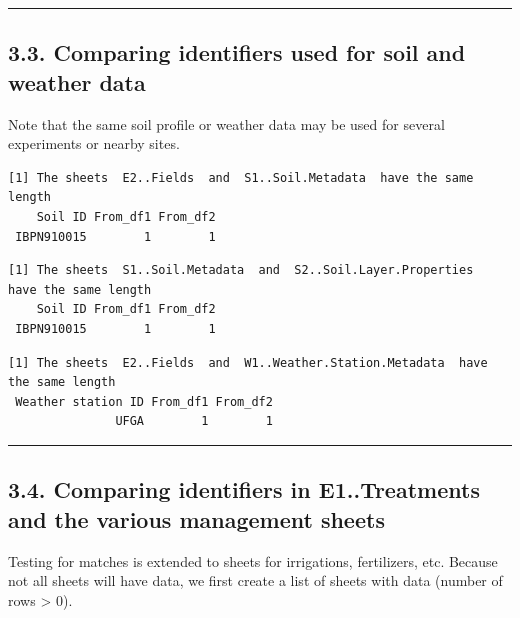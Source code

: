 \documentclass[
]{article}
\begin{document}
\begin{center}\rule{0.5\linewidth}{0.5pt}\end{center}

\subsection{3.3. Comparing identifiers used for soil and weather
data}\label{comparing-identifiers-used-for-soil-and-weather-data}

Note that the same soil profile or weather data may be used for several
experiments or nearby sites.

\begin{verbatim}
[1] The sheets  E2..Fields  and  S1..Soil.Metadata  have the same length
    Soil ID From_df1 From_df2
 IBPN910015        1        1
\end{verbatim}

\begin{verbatim}
[1] The sheets  S1..Soil.Metadata  and  S2..Soil.Layer.Properties  have the same length
    Soil ID From_df1 From_df2
 IBPN910015        1        1
\end{verbatim}

\begin{verbatim}
[1] The sheets  E2..Fields  and  W1..Weather.Station.Metadata  have the same length
 Weather station ID From_df1 From_df2
               UFGA        1        1
\end{verbatim}

\begin{center}\rule{0.5\linewidth}{0.5pt}\end{center}

\subsection{3.4. Comparing identifiers in E1..Treatments and the various
management
sheets}\label{comparing-identifiers-in-e1..treatments-and-the-various-management-sheets}

Testing for matches is extended to sheets for irrigations, fertilizers,
etc. Because not all sheets will have data, we first create a list of
sheets with data (number of rows \textgreater{} 0).
\end{document}
